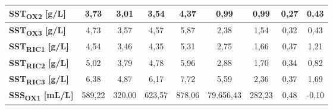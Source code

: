\begin{sidewaystable}[h]
\begin{center}
\begin{tabular}{lcccccccc}
		\multicolumn{1}{|l|}{\textbf{SST\textsubscript{OX2} {[}g/L{]}}}         & \multicolumn{1}{c|}{3,73}           & \multicolumn{1}{c|}{3,01}                    & \multicolumn{1}{c|}{3,54}             & \multicolumn{1}{c|}{4,37}                    & \multicolumn{1}{c|}{0,99}              & \multicolumn{1}{c|}{0,99}              & \multicolumn{1}{c|}{0,27}        & \multicolumn{1}{c|}{0,43}           \\ \hline
		\multicolumn{1}{|l|}{\textbf{SST\textsubscript{OX3} {[}g/L{]}}}         & \multicolumn{1}{c|}{4,73}           & \multicolumn{1}{c|}{3,57}                    & \multicolumn{1}{c|}{4,57}             & \multicolumn{1}{c|}{5,87}                    & \multicolumn{1}{c|}{2,38}              & \multicolumn{1}{c|}{1,54}              & \multicolumn{1}{c|}{0,32}        & \multicolumn{1}{c|}{0,43}           \\ \hline
		\multicolumn{1}{|l|}{\textbf{SST\textsubscript{RIC1} {[}g/L{]}}}        & \multicolumn{1}{c|}{4,54}           & \multicolumn{1}{c|}{3,46}                    & \multicolumn{1}{c|}{4,35}             & \multicolumn{1}{c|}{5,31}                    & \multicolumn{1}{c|}{2,75}              & \multicolumn{1}{c|}{1,66}              & \multicolumn{1}{c|}{0,37}        & \multicolumn{1}{c|}{1,21}           \\ \hline
		\multicolumn{1}{|l|}{\textbf{SST\textsubscript{RIC2} {[}g/L{]}}}        & \multicolumn{1}{c|}{5,02}           & \multicolumn{1}{c|}{3,79}                    & \multicolumn{1}{c|}{4,78}             & \multicolumn{1}{c|}{5,96}                    & \multicolumn{1}{c|}{2,88}              & \multicolumn{1}{c|}{1,70}              & \multicolumn{1}{c|}{0,34}        & \multicolumn{1}{c|}{0,82}           \\ \hline
		\multicolumn{1}{|l|}{\textbf{SST\textsubscript{RIC3} {[}g/L{]}}}        & \multicolumn{1}{c|}{6,38}           & \multicolumn{1}{c|}{4,87}                    & \multicolumn{1}{c|}{6,17}             & \multicolumn{1}{c|}{7,72}                    & \multicolumn{1}{c|}{5,59}              & \multicolumn{1}{c|}{2,36}              & \multicolumn{1}{c|}{0,37}        & \multicolumn{1}{c|}{1,69}           \\ \hline
		\multicolumn{1}{|l|}{\textbf{SSS\textsubscript{OX1} {[}mL/L{]}}}        & \multicolumn{1}{c|}{589,22}         & \multicolumn{1}{c|}{320,00}                  & \multicolumn{1}{c|}{623,57}           & \multicolumn{1}{c|}{878,06}                  & \multicolumn{1}{c|}{79.656,43}         & \multicolumn{1}{c|}{282,23}            & \multicolumn{1}{c|}{0,48}        & \multicolumn{1}{c|}{-0,10}          \\ \hline

\end{tabular}
\end{center}
\end{sidewaystable}

